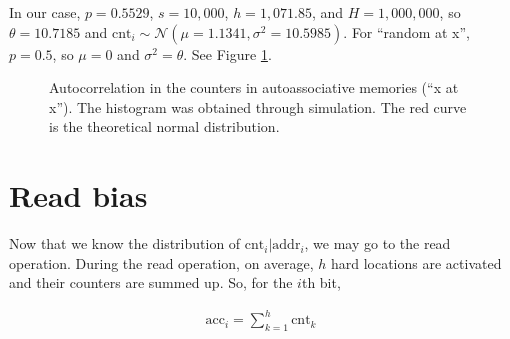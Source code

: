 \documentclass[12pt]{article}
\begin{document}
In our case, $p=0.5529$, $s=10,000$, $h=1,071.85$, and $H=1,000,000$, so $\theta = 10.7185$ and $\text{cnt}_i \sim \mathcal{N}(\mu=1.1341, \sigma^2 = 10.5985)$. For ``random at x'', $p=0.5$, so $\mu = 0$ and $\sigma^2 = \theta$. See Figure \ref{fig:sdm-corr-counters}.

\begin{figure}[h!]
  \centering

  \caption{Autocorrelation in the counters in autoassociative memories (``x at x''). The histogram was obtained through simulation. The red curve is the theoretical normal distribution.}
  \label{fig:sdm-corr-counters}
\end{figure}


\section{Read bias}

Now that we know the distribution of $\text{cnt}_i | \text{addr}_i$, we may go to the read operation. During the read operation, on average, $h$ hard locations are activated and their counters are summed up. So, for the $i$th bit,

\begin{align}
\text{acc}_i = \sum_{k=1}^{h} \text{cnt}_k
\end{align}
\end{document}

